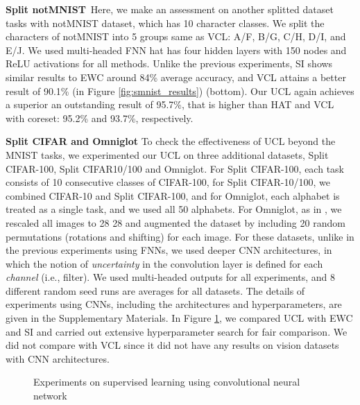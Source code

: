 \textbf{Split notMNIST}\ 
Here, we make an assessment on another splitted dataset tasks with notMNIST dataset, which has 10 character classes.
We split the characters of notMNIST into 5 groups same as VCL\cite{(VCL)NguLiBuiTurner18}: A/F, B/G, C/H, D/I, and E/J. 
We used multi-headed FNN hat has four hidden layers with 150 nodes and ReLU activations for all methods.
Unlike the previous experiments, SI shows similar results to EWC around 84\% average accuracy, and VCL attains a better result of 90.1\% (in Figure \ref{fig:smnist_results}) (bottom). Our UCL again achieves a superior an outstanding result of 95.7\%, that is higher than HAT and VCL with coreset: 95.2\% and 93.7\%, respectively.





\noindent\textbf{Split CIFAR and Omniglot} To check the effectiveness of UCL beyond the MNIST tasks, we experimented our UCL on three additional datasets, Split CIFAR-100, Split CIFAR10/100 and Omniglot. For Split CIFAR-100, each task consists of 10 consecutive classes of CIFAR-100, for Split CIFAR-10/100, we combined CIFAR-10 and Split CIFAR-100,  and for Omniglot, each alphabet is treated as a single task, and we used all 50 alphabets. For Omniglot, as in \cite{(ProgressCompress)SchwarzLuketinaHadsell18}, we rescaled all images to 28  28 and augmented the dataset by including 20 random permutations (rotations and shifting) for each image. For these datasets, unlike in the previous experiments using FNNs, we used deeper CNN architectures, in which the notion of \emph{uncertainty} in the convolution layer is defined for each \emph{channel} (i.e., filter). We used multi-headed outputs for all experiments, and 8 different random seed runs are averages for all datasets. The details of experiments using CNNs, including the architectures and hyperparameters, 
are given in the Supplementary Materials.
In Figure \ref{fig:vision}, we compared UCL with EWC and SI and carried out extensive hyperparameter search for fair comparison. We did not compare with VCL since it did not have any results on vision datasets with CNN architectures. 
\vspace{-.1in}
\begin{figure}[ht]
    \centering
    \vspace{-.1in}
    \caption{Experiments on supervised learning using convolutional neural network}\label{fig:vision}
\end{figure}
\vspace{-.1in}

